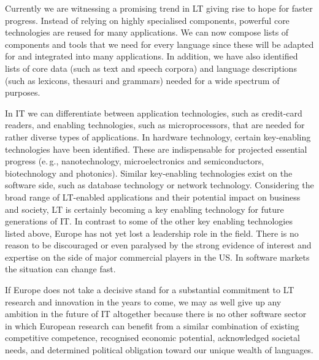 \documentclass[10pt, plain]{../../metanetpaper}
\begin{document}
\begin{multicols}{2}
Currently we are witnessing a promising trend in LT giving rise to hope for faster progress. Instead of relying on highly specialised components, powerful core technologies are reused for many applications. We can now compose lists of components and tools that we need for every language since these will be adapted for and integrated into many applications. In addition, we have also identified lists of core data (such as text and speech corpora) and language descriptions (such as lexicons, thesauri and grammars) needed for a wide spectrum of purposes.

%

In IT we can differentiate between application technologies, such as credit-card readers, and enabling technologies, such as microprocessors, that are needed for rather diverse types of applications. In hardware technology, certain key-enabling technologies have been identified. These are indispensable for projected essential progress (e.\,g., nanotechnology, microelectronics and semiconductors, biotechnology and photonics). Similar key-enabling technologies exist on the software side, such as database technology or network technology. Considering the broad range of LT-enabled applications and their potential impact on business and society, LT is certainly becoming a key enabling technology for future generations of IT. In contrast to some of the other key enabling technologies listed above, Europe has not yet lost a leadership role in the field. There is no reason to be discouraged or even paralysed by the strong evidence of interest and expertise on the side of major commercial players in the US. In software markets the situation can change fast.

If Europe does not take a decisive stand for a substantial commitment to LT research and innovation in the years to come, we may as well give up any ambition in the future of IT altogether because there is no other software sector in which European research can benefit from a similar combination of existing competitive competence, recognised economic potential, acknowledged societal needs, and determined political obligation toward our unique wealth of languages.
\end{multicols}

\clearpage
\end{document}
